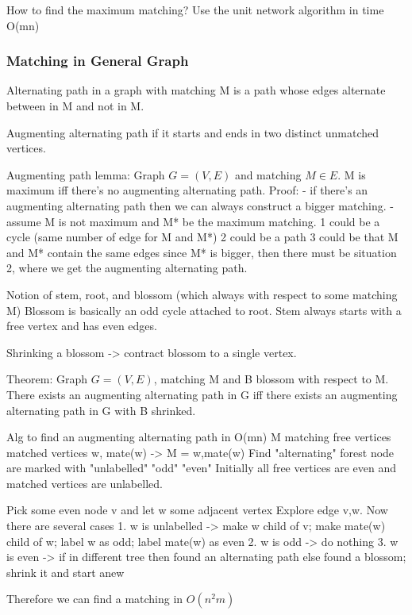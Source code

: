\documentclass{article}
\begin{document}
How to find the maximum matching?  Use the unit network algorithm in time
O(m\sqrt n)

\subsubsection{Matching in General Graph}
Alternating path in a graph with matching M is a path whose edges alternate
between in M and not in M.

Augmenting alternating path if it starts and ends in two distinct unmatched
vertices.

Augmenting path lemma:
Graph $G=(V,E)$ and matching $M\in E$.  M is maximum iff there's no augmenting
alternating path.
Proof: 
- if there's an augmenting alternating path then we can always construct a bigger matching.
- assume M is not maximum and M* be the maximum matching.
	1 could be a cycle (same number of edge for M and M*)
	2 could be a path
	3 could be that M and M* contain the same edges
  since M* is bigger, then there must be situation 2, where we get the augmenting alternating path.

Notion of stem, root, and blossom (which always with respect to some matching M)
Blossom is basically an odd cycle attached to root.
Stem always starts with a free vertex and has even edges.

Shrinking a blossom -> contract blossom to a single vertex.

Theorem:
Graph $G=(V,E)$, matching M and B blossom with respect to M.  There exists an
augmenting alternating path in G iff there exists an augmenting alternating
path in G with B shrinked.

Alg to find an augmenting alternating path in O(mn)
M matching
free vertices
matched vertices w, mate(w) -> M = {w,mate(w)}
Find "alternating" forest
	node are marked with "unlabelled" "odd" "even"
Initially all free vertices are even and matched vertices are unlabelled.

Pick some even node v and let w some adjacent vertex
Explore edge {v,w}.  Now there are several cases
1. w is unlabelled -> make w child of v; make mate(w) child of w; label w as odd; label mate(w) as even
2. w is odd -> do nothing
3. w is even -> if in different tree then found an alternating path
		else found a blossom; shrink it and start anew

Therefore we can find a matching in $O(n^2m)$
\end{document}
